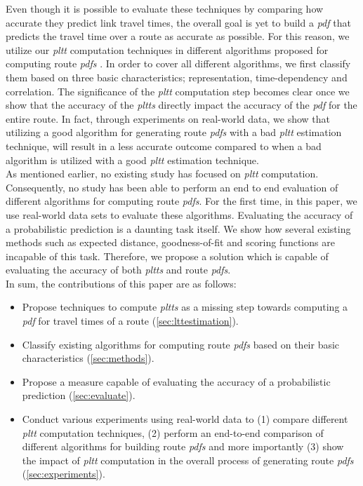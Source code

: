 Even though it is possible to evaluate these techniques by comparing how accurate they predict link travel times, the overall goal is yet to build a \textit{pdf} that predicts the travel time over a route as accurate as possible. For this reason, we utilize our \textit{pltt} computation techniques in different algorithms proposed for computing route \textit{pdfs} \cite{Frank69,Miller-Hooks98,Miller-Hooks00, Nie09b,Seshadri10, Zockaei13,Bi-Yu13,Nie06,Hua10,Fan05,Dong12,Nie09a} . In order to cover all different algorithms, we first classify them based on three basic characteristics; representation, time-dependency and correlation. The significance of the \textit{pltt} computation step becomes clear once we show that the accuracy of the \textit{pltts} directly impact the accuracy of the \textit{pdf} for the entire route. In fact, through experiments on real-world data, we show that utilizing a good algorithm for generating route \textit{pdfs} with a bad \textit{pltt} estimation technique, will result in a less accurate outcome compared to when a bad algorithm is utilized with a good \textit{pltt} estimation technique.\\
As mentioned earlier, no existing study has focused on \textit{pltt} computation. Consequently, no study has been able to perform an end to end evaluation of different algorithms for computing route \textit{pdfs}. For the first time, in this paper, we use real-world data sets to evaluate these algorithms. Evaluating the accuracy of a probabilistic prediction is a daunting task itself. We show how several existing methods such as expected distance, goodness-of-fit and scoring functions are incapable of this task. Therefore, we propose a solution which is capable of evaluating the accuracy of both \textit{pltts} and route \textit{pdfs}.\\
In sum, the contributions of this paper are as follows:
\begin{itemize}
\item Propose techniques to compute \textit{pltts} as a missing step towards computing a \textit{pdf} for travel times of a route (\cref{sec:lttestimation}).
\item Classify existing algorithms for computing route \textit{pdfs} based on their basic characteristics (\cref{sec:methods}).
\item Propose a measure capable of evaluating the accuracy of a probabilistic prediction (\cref{sec:evaluate}).
\item Conduct various experiments using real-world data to (1) compare different \textit{pltt} computation techniques, (2) perform an end-to-end comparison of different algorithms for building route \textit{pdfs} and more importantly (3) show the impact of \textit{pltt} computation in the overall process of generating route \textit{pdfs} (\cref{sec:experiments}).
\end{itemize} 


